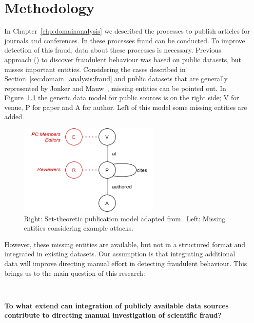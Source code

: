 \documentclass{ou-report}
\begin{document}
\chapter{Methodology}
\label{chp:methodology}
In Chapter~\ref{chp:domainanalysis} we described the processes to publish 
articles for journals and conferences. In these processes fraud can be conducted.
%
To improve detection of this fraud, data about these processes is necessary.
Previous approach (\cite{TEJ2017}) to discover fraudulent behaviour was based 
on public datasets, but misses important entities. 
%
Considering the cases described in Section~\ref{sec:domain_analysis:fraud} and 
public datasets that are generally represented by Jonker and Mauw~\cite{JM2017},
missing entities can be pointed out.
In Figure~\ref{fig:jm2017_missing_ent} the generic data model for public 
sources is on the right side; V for venue, P for paper and A for author. Left of
this model some missing entities are added.


\begin{figure}[H]
\centering
\includegraphics[width=7cm]{images/jm2017_miss_ent.png}
\caption{Right: Set-theoretic publication model adapted from~\cite{JM2017} Left: Missing entities considering example attacks.}
\label{fig:jm2017_missing_ent}
\end{figure}

However, these missing entities are available, but not in a structured format 
and integrated in existing datasets. Our assumption is that integrating 
additional data will improve directing manual effort in detecting fraudulent
behaviour. This brings us to the main question of this research:

\ \\
\begin{center}
\textbf{To what extend can integration of publicly available data sources 
contribute \newline to directing manual investigation of scientific fraud?} \\
\end{center}
\end{document}
